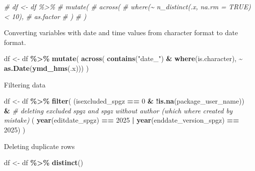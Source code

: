 \documentclass[
]{article}
\newenvironment{Shaded}{\begin{snugshade}}{\end{snugshade}}
\newcommand{\CommentTok}[1]{\textcolor[rgb]{0.56,0.35,0.01}{\textit{#1}}}
\newcommand{\DecValTok}[1]{\textcolor[rgb]{0.00,0.00,0.81}{#1}}
\newcommand{\FunctionTok}[1]{\textcolor[rgb]{0.13,0.29,0.53}{\textbf{#1}}}
\newcommand{\NormalTok}[1]{#1}
\newcommand{\OtherTok}[1]{\textcolor[rgb]{0.56,0.35,0.01}{#1}}
\newcommand{\SpecialCharTok}[1]{\textcolor[rgb]{0.81,0.36,0.00}{\textbf{#1}}}
\newcommand{\StringTok}[1]{\textcolor[rgb]{0.31,0.60,0.02}{#1}}
\begin{document}
\begin{Shaded}
\begin{Highlighting}[]
\CommentTok{\# df \textless{}{-} df \%\textgreater{}\% }
\CommentTok{\#   mutate(}
\CommentTok{\#     across(}
\CommentTok{\#       where(\textasciitilde{} n\_distinct(.x, na.rm = TRUE) \textless{} 10),}
\CommentTok{\#       as.factor}
\CommentTok{\#     )}
\CommentTok{\#     )}
\end{Highlighting}
\end{Shaded}

Converting variables with date and time values from character format to
date format.

\begin{Shaded}
\begin{Highlighting}[]
\NormalTok{df }\OtherTok{\textless{}{-}}\NormalTok{ df }\SpecialCharTok{\%\textgreater{}\%} 
  \FunctionTok{mutate}\NormalTok{(}
    \FunctionTok{across}\NormalTok{(}
      \FunctionTok{contains}\NormalTok{(}\StringTok{"date\_"}\NormalTok{) }\SpecialCharTok{\&} \FunctionTok{where}\NormalTok{(is.character), }
           \SpecialCharTok{\textasciitilde{}} \FunctionTok{as.Date}\NormalTok{(}\FunctionTok{ymd\_hms}\NormalTok{(.x)))}
\NormalTok{  )}
\end{Highlighting}
\end{Shaded}

Filtering data

\begin{Shaded}
\begin{Highlighting}[]
\NormalTok{df }\OtherTok{\textless{}{-}}\NormalTok{ df }\SpecialCharTok{\%\textgreater{}\%} 
  \FunctionTok{filter}\NormalTok{(}
\NormalTok{    (isexcluded\_spgz }\SpecialCharTok{==} \DecValTok{0} \SpecialCharTok{\&} \SpecialCharTok{!}\FunctionTok{is.na}\NormalTok{(package\_user\_name)) }\SpecialCharTok{\&} \CommentTok{\# deleting excluded spgz and spgz without author (which where created by mistake)}
\NormalTok{      (}
           \FunctionTok{year}\NormalTok{(editdate\_spgz) }\SpecialCharTok{==} \DecValTok{2025} \SpecialCharTok{|}
         \FunctionTok{year}\NormalTok{(enddate\_version\_spgz) }\SpecialCharTok{==} \DecValTok{2025}\NormalTok{)}
\NormalTok{        )}
\end{Highlighting}
\end{Shaded}

Deleting duplicate rows

\begin{Shaded}
\begin{Highlighting}[]
\NormalTok{df }\OtherTok{\textless{}{-}}\NormalTok{ df }\SpecialCharTok{\%\textgreater{}\%} 
   \FunctionTok{distinct}\NormalTok{()}
\end{Highlighting}
\end{Shaded}
\end{document}
